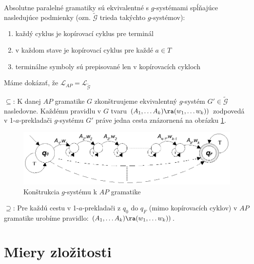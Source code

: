 \begin{veta}
Absolutne paralelné gramatiky sú ekvivalentné s $g$-systémami
spĺňajúce nasledujúce podmienky (ozn. $\tilde{\mathcal{G}}$ trieda
takýchto $g$-systémov):
\begin{enumerate}
  \item každý cyklus je kopírovací cyklus pre terminál
  \item v každom stave je kopírovací cyklus pre každé $a\in T$
  \item terminálne symboly sú prepisované len v kopírovacích cykloch
\end{enumerate}
\end{veta}

\begin{dokaz}
Máme dokázať, že
$\mathcal{L}_{AP}=\mathcal{L}_{\tilde{\mathcal{G}}}$
\begin{description}
\item{$\subseteq$:} K danej $AP$ gramatike $G$ zkonštruujeme ekvivalentný $g$-systém
$G'\in\tilde{\mathcal{G}}$ nasledovne. Každému pravidlu v $G$
tvaru $(A_1,\dots A_k)\ra (w_1,\dots w_k))$ zodpovedá v
1-$a$-prekladači $g$-systému $G'$ práve jedna cesta znázornená na
obrázku \ref{gs_obr_ap}.

\begin{figure}[!ht]
\centering
\includegraphics{./OBRAZKY/GSYSTEMS/AP}
\caption{Konštrukcia $g$-systému k $AP$ gramatike} \label{gs_obr_ap}
\end{figure}

\item{$\supseteq$:} Pre každú cestu v 1-$a$-prekladači z $q_0$ do $q_F$
(mimo kopírovacích cyklov) v $AP$ gramatike urobíme pravidlo:
$(A_1,\dots A_k)\ra (w_1,\dots w_k))$.
\end{description}
\end{dokaz}

\section{Miery zložitosti}

